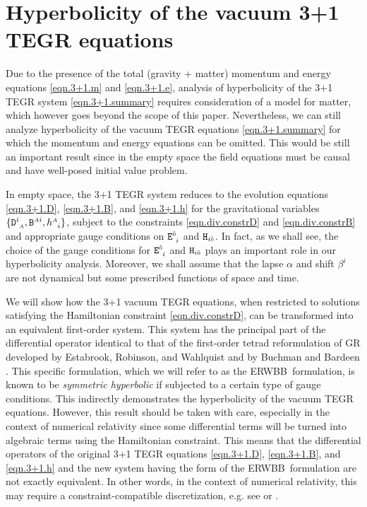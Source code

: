 \documentclass[
10pt, %
a4paper, %
oneside, %
twocolumn,
headinclude,footinclude, %
BCOR5mm, %
]{scrartcl}
\newcommand{\ERWBB}{{ERWBB}}
\newcommand{\sA}{\mathsmaller A}
\newcommand{\tetrsymbol}{h}
\newcommand{\tetr}[2]{\tetrsymbol^{#1}_{\phantom{#1}#2}}
\newcommand{\Dfin}[2]{\mathtt{D}_{\phantom{#2}#1}^{#2}}	%
\newcommand{\Hfin}[2]{\mathtt{H}_{#2#1}}	%
\newcommand{\Efin}[2]{\mathtt{E}^{#1}_{\phantom{#1}#2}}	%
\newcommand{\Bfin}[2]{\mathtt{B}^{#1#2}}	%
\newcommand{\indalg}[1]{\hat{\mathsmaller{#1}}}
\newcommand{\lapse}{\alpha}
\newcommand{\shift}[1]{\beta^{#1}}
\begin{document}
	
	
	\section{Hyperbolicity of the vacuum 3+1 TEGR equations}\label{sec.hyperbolicity}

	Due to the presence of the total (gravity + matter) momentum and energy
	equations \eqref{eqn.3+1.m} and \eqref{eqn.3+1.e}, analysis of hyperbolicity
	of the 3+1 TEGR system \eqref{eqn.3+1.summary} requires consideration of a
	model for matter, which however goes beyond the scope of this paper.
	Nevertheless, we can still analyze hyperbolicity of the vacuum TEGR
	equations \eqref{eqn.3+1.summary} for which the momentum and energy
	equations can be omitted. This would be still an important result since in
	the empty space the field equations must be causal and have well-posed
	initial value problem. 
	
	In empty space, the 3+1 TEGR system reduces to the evolution equations
	\eqref{eqn.3+1.D}, \eqref{eqn.3+1.B}, and \eqref{eqn.3+1.h} for the
	gravitational variables $\{\Dfin{\sA}{i},\Bfin{\sA}{i},\tetr{\sA}{i}\}$,
	subject to the constraints \eqref{eqn.div.constrD} and
	\eqref{eqn.div.constrB} and appropriate gauge conditions on
	$\Efin{\indalg{0}}{i}$ and $\Hfin{\indalg{0}}{i}$. In fact, as we shall see,
	the choice of the gauge conditions for $\Efin{\indalg{0}}{i}$ and
	$\Hfin{\indalg{0}}{i}$ plays an important role in our hyperbolicity
	analysis. Moreover, we shall assume that the lapse $\lapse$ and shift
	$\shift{i}$ are not dynamical but some prescribed functions of space and
	time.

	We will show how the 3+1 vacuum TEGR equations, when restricted to solutions
	satisfying the Hamiltonian constraint \eqref{eqn.div.constrD}, can be
	transformed into an equivalent first-order system. This system has the
	principal part of the differential operator identical to that of the
	first-order tetrad reformulation of GR developed by Estabrook, Robinson, and
	Wahlquist \cite{Estabrook1997} and by Buchman and Bardeen
	\cite{Estabrook1997}. This specific formulation, which we will refer to as
	the \ERWBB\ formulation, is known to be \textit{symmetric hyperbolic} if
	subjected to a certain type of gauge conditions. This indirectly
	demonstrates the hyperbolicity of the vacuum TEGR equations. However, this
	result should be taken with care, especially in the context of numerical
	relativity since some differential terms will be turned into algebraic terms
	using the Hamiltonian constraint. This means that the differential operators
	of the original 3+1 TEGR equations \eqref{eqn.3+1.D}, \eqref{eqn.3+1.B}, and
	\eqref{eqn.3+1.h} and the new system having the form of the \ERWBB\
	formulation are not exactly equivalent. In other words, in the context of
	numerical relativity, this may require a constraint-compatible
	discretization, e.g. see \cite[Sec.VI.G]{Olivares2022} or
	\cite{oliynyk2025}.
\end{document}
